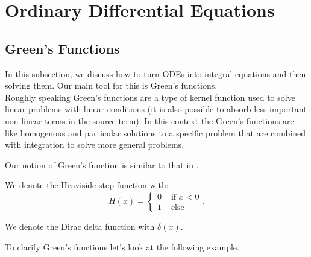\documentclass[a4paper,12pt]{article}
\begin{document}
\section{Ordinary Differential Equations}

\subsection{Green's Functions}
In this subsection, we discuss how to turn ODEs into integral equations and
then solving them. Our main tool for this is Green's functions. \\

Roughly speaking Green's functions are a type
of kernel function used to solve linear problems with linear
conditions (it is also possible to absorb less important non-linear terms in
the source term). In this context the Green's functions are
like homogenous and particular solutions to a specific problem
that are combined with integration to solve more general problems.

\begin{related}
    Our notion of Green's function is similar
    to that in \cite{hwang_simulationtabulation_2001}.
\end{related}


\begin{notation}[$H$]
    We denote the Heaviside step function with:
    \begin{equation}
        H(x) = \begin{cases}
            0 & \text{ if } x<0 \\
            1 & \text{ else }
        \end{cases}.
    \end{equation}
\end{notation}

\begin{notation}[$\delta$]
    We denote the Dirac delta function with $\delta(x)$.
\end{notation}


To clarify Green's functions let's look at the following example.
\end{document}

